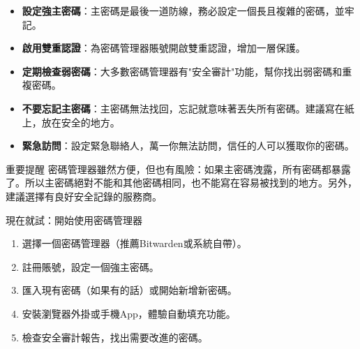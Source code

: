 
\begin{itemize}
  \item \textbf{設定強主密碼}：主密碼是最後一道防線，務必設定一個長且複雜的密碼，並牢記。
  \item \textbf{啟用雙重認證}：為密碼管理器賬號開啟雙重認證，增加一層保護。
  \item \textbf{定期檢查弱密碼}：大多數密碼管理器有"安全審計"功能，幫你找出弱密碼和重複密碼。
  \item \textbf{不要忘記主密碼}：主密碼無法找回，忘記就意味著丟失所有密碼。建議寫在紙上，放在安全的地方。
  \item \textbf{緊急訪問}：設定緊急聯絡人，萬一你無法訪問，信任的人可以獲取你的密碼。
\end{itemize}

\begin{tcbwarn}{重要提醒}
密碼管理器雖然方便，但也有風險：如果主密碼洩露，所有密碼都暴露了。所以主密碼絕對不能和其他密碼相同，也不能寫在容易被找到的地方。另外，建議選擇有良好安全記錄的服務商。

\end{tcbwarn}

\begin{tcbpractice}{現在就試：開始使用密碼管理器}
\begin{enumerate}
  \item 選擇一個密碼管理器（推薦Bitwarden或系統自帶）。
  \item 註冊賬號，設定一個強主密碼。
  \item 匯入現有密碼（如果有的話）或開始新增新密碼。
  \item 安裝瀏覽器外掛或手機App，體驗自動填充功能。
  \item 檢查安全審計報告，找出需要改進的密碼。
\end{enumerate}

\end{tcbpractice}

